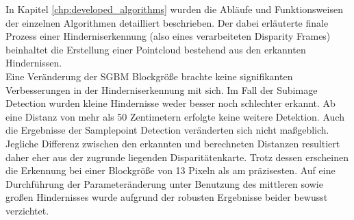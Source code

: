 \noindent
In Kapitel \ref{chp:developed_algorithms} wurden die Abläufe und Funktionsweisen der einzelnen Algorithmen detailliert beschrieben. Der dabei erläuterte finale Prozess einer Hinderniserkennung (also eines verarbeiteten Disparity Frames) beinhaltet die Erstellung einer Pointcloud bestehend aus den erkannten Hindernissen.\\

\noindent
Eine Veränderung der SGBM Blockgröße brachte keine signifikanten Verbesserungen in der Hinderniserkennung mit sich. Im Fall der Subimage Detection wurden kleine Hindernisse weder besser noch schlechter erkannt. Ab eine Distanz von mehr als 50 Zentimetern erfolgte keine weitere Detektion. Auch die Ergebnisse der Samplepoint Detection veränderten sich nicht maßgeblich. Jegliche Differenz zwischen den erkannten und berechneten Distanzen resultiert daher eher aus der zugrunde liegenden Disparitätenkarte. Trotz dessen erscheinen die Erkennung bei einer Blockgröße von 13 Pixeln als am präzisesten. Auf eine Durchführung der Parameteränderung unter Benutzung des mittleren sowie großen Hindernisses wurde aufgrund der robusten Ergebnisse beider bewusst verzichtet.\\

\noindent
